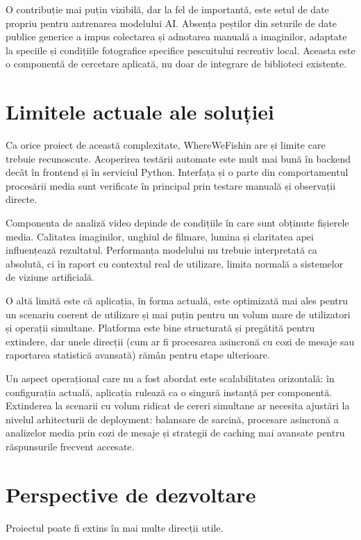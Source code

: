 O contribuție mai puțin vizibilă, dar la fel de importantă, este setul de date propriu pentru antrenarea modelului AI. Absența peștilor din seturile de date publice generice a impus colectarea și adnotarea manuală a imaginilor, adaptate la speciile și condițiile fotografice specifice pescuitului recreativ local. Aceasta este o componentă de cercetare aplicată, nu doar de integrare de biblioteci existente.

\section{Limitele actuale ale soluției}

Ca orice proiect de această complexitate, WhereWeFishin are și limite care trebuie recunoscute. Acoperirea testării automate este mult mai bună în backend decât în frontend și în serviciul Python. Interfața și o parte din comportamentul procesării media sunt verificate în principal prin testare manuală și observații directe.

Componenta de analiză video depinde de condițiile în care sunt obținute fișierele media. Calitatea imaginilor, unghiul de filmare, lumina și claritatea apei influențează rezultatul. Performanța modelului nu trebuie interpretată ca absolută, ci în raport cu contextul real de utilizare, limita normală a sistemelor de viziune artificială.

O altă limită este că aplicația, în forma actuală, este optimizată mai ales pentru un scenariu coerent de utilizare și mai puțin pentru un volum mare de utilizatori și operații simultane. Platforma este bine structurată și pregătită pentru extindere, dar unele direcții (cum ar fi procesarea asincronă cu cozi de mesaje sau raportarea statistică avansată) rămân pentru etape ulterioare.

Un aspect operațional care nu a fost abordat este scalabilitatea orizontală: în configurația actuală, aplicația rulează ca o singură instanță per componentă. Extinderea la scenarii cu volum ridicat de cereri simultane ar necesita ajustări la nivelul arhitecturii de deployment: balansare de sarcină, procesare asincronă a analizelor media prin cozi de mesaje și strategii de caching mai avansate pentru răspunsurile frecvent accesate.

\section{Perspective de dezvoltare}

Proiectul poate fi extins în mai multe direcții utile.

